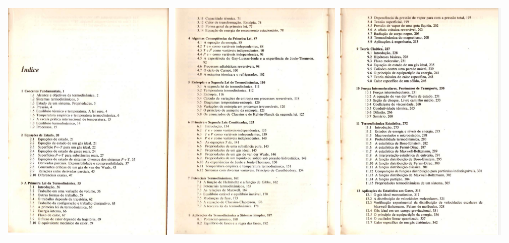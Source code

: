 \begin{frame}
    \centering
    \includegraphics[width=0.32\textwidth]{images/Captura de tela de 2023-03-27 07-48-56.png}
    \includegraphics[width=0.32\textwidth]{images/Captura de tela de 2023-03-27 07-49-06.png}
    \includegraphics[width=0.32\textwidth]{images/Captura de tela de 2023-03-27 07-49-18.png}
\end{frame}


